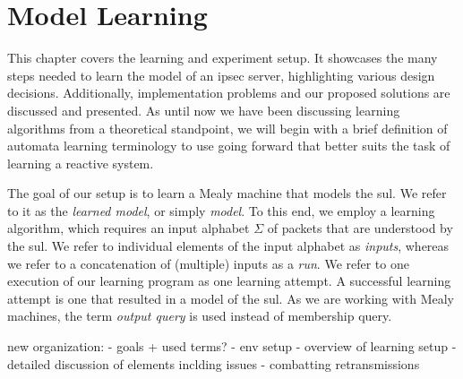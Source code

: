 %
%
% 
% 
% 

\chapter{Model Learning}

\label{chap:Learning}


This chapter covers the learning and experiment setup. It showcases the many steps needed to learn the model of an \ac{ipsec} server, highlighting various design decisions. Additionally, implementation problems and our proposed solutions are discussed and presented. As until now we have been discussing learning algorithms from a theoretical standpoint, we will begin with a brief definition of automata learning terminology to use going forward that better suits the task of learning a reactive system. 

The goal of our setup is to learn a Mealy machine that models the \ac{sul}. We refer to it as the \textit{learned model}, or simply \textit{model}. To this end, we employ a learning algorithm, which requires an input alphabet $\Sigma$ of packets that are understood by the \ac{sul}. We refer to individual elements of the input alphabet as \textit{inputs}, whereas we refer to a concatenation of (multiple) inputs as a \textit{run}. We refer to one execution of our learning program as one learning attempt. A successful learning attempt is one that resulted in a model of the \ac{sul}. As we are working with Mealy machines, the term \textit{output query} is used instead of membership query.

new organization: 
- goals + used terms?
- env setup
- overview of learning setup
- detailed discussion of elements inclding issues
- combatting retransmissions


